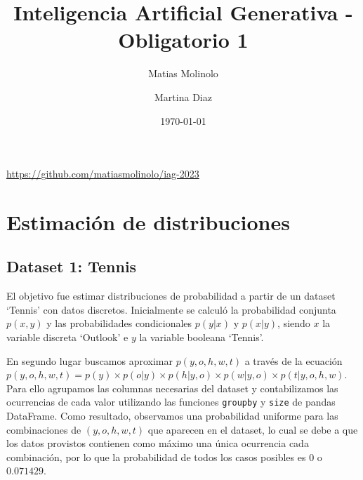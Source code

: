 \documentclass[11pt]{article}
\title{Inteligencia Artificial Generativa - Obligatorio 1}
\author{Matias Molinolo}
\author{Martina Diaz}
\affil{Facultad de Ingeniería, Universidad ORT Uruguay}
\date{\today}
\begin{document}
\maketitle
\begin{center}
    \url{https://github.com/matiasmolinolo/iag-2023}
\end{center}
\thispagestyle{empty}
\newpage
\tableofcontents
\newpage

\section{Estimación de distribuciones}

\subsection{Dataset 1: Tennis}
El objetivo fue estimar distribuciones de probabilidad a partir de un dataset `Tennis' con datos discretos. Inicialmente se calculó la probabilidad conjunta $p(x,y)$ y las probabilidades condicionales $p(y|x)$ y $p(x|y)$, siendo $x$ la variable discreta `Outlook' e $y$ la variable booleana `Tennis'. 

En segundo lugar buscamos aproximar $p(y,o,h,w,t)$ a través de la ecuación $p(y,o,h,w,t) = p(y) \times p(o|y) \times p(h|y,o) \times p(w|y,o) \times p(t|y,o,h,w)$. Para ello agrupamos las columnas necesarias del dataset y contabilizamos las ocurrencias de cada valor utilizando las funciones \texttt{groupby} y \texttt{size} de pandas DataFrame. Como resultado, observamos una probabilidad uniforme para las combinaciones de $(y,o,h,w,t)$ que aparecen en el dataset, lo cual se debe a que los datos provistos contienen como máximo una única ocurrencia cada combinación, por lo que la probabilidad de todos los casos posibles es $0$ o $0.071429$.
\end{document}
